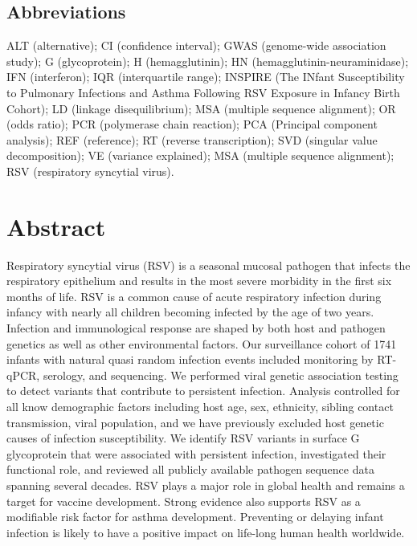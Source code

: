 \documentclass{article}
\begin{document}
\subsection*{Abbreviations}
ALT (alternative);
CI (confidence interval);
GWAS (genome-wide association study);
G (glycoprotein);
H (hemagglutinin);
HN (hemagglutinin-neuraminidase);
IFN (interferon);
IQR (interquartile range);
INSPIRE (The INfant Susceptibility to Pulmonary Infections and Asthma Following RSV Exposure in Infancy Birth Cohort);
LD (linkage disequilibrium);
MSA (multiple sequence alignment);
OR (odds ratio);
PCR (polymerase chain reaction);
PCA (Principal component analysis);
REF (reference);
RT (reverse transcription);
SVD (singular value decomposition);
VE (variance explained);
MSA (multiple sequence alignment);
RSV (respiratory syncytial virus).

\section{Abstract}
Respiratory syncytial virus (RSV) is a seasonal mucosal pathogen that infects the respiratory epithelium and results in the most severe morbidity in the first six months of life. 
RSV is a common cause of acute respiratory infection during infancy with nearly all children becoming infected by the age of two years.
Infection and immunological response are shaped by both host and pathogen genetics as well as other environmental factors. 
Our surveillance cohort of 1741 infants with
natural quasi random infection events included monitoring by RT-qPCR, serology, and sequencing. 
We performed viral genetic association testing to detect variants that contribute to persistent infection.
Analysis controlled for all know demographic factors including host age, sex, ethnicity, sibling contact transmission, viral population, and we have previously excluded host genetic causes of infection susceptibility.
We identify RSV variants in surface G glycoprotein that were associated with persistent infection, investigated their functional role, and reviewed all publicly available pathogen sequence data spanning several decades. 
RSV plays a major role in global health and remains a target for vaccine development.
Strong evidence also supports RSV as a modifiable risk factor for asthma development. Preventing or delaying infant infection is likely to have a positive impact on life-long human health worldwide.
\end{document}
